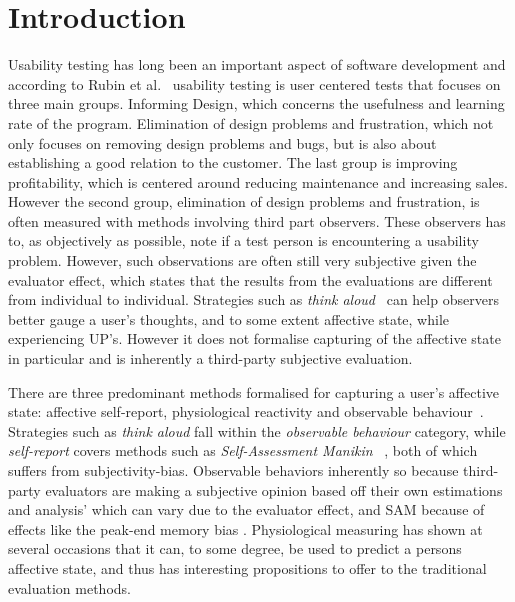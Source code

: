 \section{Introduction}

Usability testing has long been an important aspect of software development and according to Rubin et al.~\cite{rubin2008handbook} usability testing is user centered tests that focuses on three main groups.
Informing Design, which concerns the usefulness and learning rate of the program.
Elimination of design problems and frustration, which not only focuses on removing design problems and bugs, but is also about establishing a good relation to the customer.
The last group is improving profitability, which is centered around reducing maintenance and increasing sales.
However the second group, elimination of design problems and frustration, is often measured with methods involving third part observers.
These observers has to, as objectively as possible, note if a test person is encountering a usability problem.
However, such observations are often still very subjective given the evaluator effect\cite{eval_effect}, which states that the results from the evaluations are different from individual to individual.
Strategies such as \textit{think aloud}~\cite{use_of_TA_and_IDA} can help observers better gauge a user's
thoughts, and to some extent affective state, while experiencing UP's. However it does
not formalise capturing of the affective state in particular and is inherently a third-party
subjective evaluation. 

There are three predominant methods formalised for capturing a user's affective state: affective self-report, physiological reactivity and
observable behaviour~\cite{BRADLEY199449}. Strategies such as \textit{think
aloud} fall within the \textit{observable behaviour} category, while
\textit{self-report} covers methods such as \textit{Self-Assessment Manikin}
~\cite{BRADLEY199449}, both of which suffers from subjectivity-bias. 
Observable behaviors inherently so because third-party evaluators are making a subjective opinion based off their own estimations and analysis' which can vary due to the evaluator effect, and SAM because of effects like the peak-end memory bias \cite{cockburn_peakend}.
Physiological measuring has shown at several occasions that it can, to some degree, be used to predict a persons affective state, and thus has interesting propositions to offer to the traditional evaluation methods.

